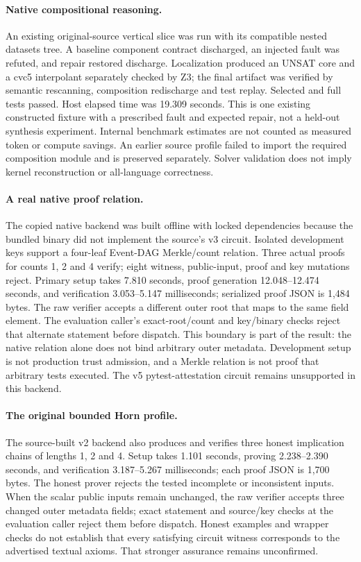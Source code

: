\paragraph{Native compositional reasoning.}
An existing original-source vertical slice was run with its compatible nested
datasets tree. A baseline component contract discharged, an injected fault was
refuted, and repair restored discharge. Localization produced an UNSAT core and
a cvc5 interpolant separately checked by Z3; the final artifact was verified by
semantic rescanning, composition redischarge and test replay. Selected and full
tests passed. Host elapsed time was 19.309 seconds. This is one existing
constructed fixture with a prescribed fault and expected repair, not a held-out
synthesis experiment. Internal benchmark estimates are not counted as measured
token or compute savings. An earlier source profile failed to import the
required composition module and is preserved separately. Solver validation
does not imply kernel reconstruction or all-language correctness.

\paragraph{A real native proof relation.}
The copied native backend was built offline with locked dependencies because
the bundled binary did not implement the source's v3 circuit. Isolated
development keys support a four-leaf Event-DAG Merkle/count relation. Three
actual proofs for counts 1, 2 and 4 verify; eight witness, public-input,
proof and key mutations reject. Primary setup takes 7.810 seconds,
proof generation 12.048--12.474 seconds, and verification
3.053--5.147 milliseconds; serialized proof JSON is 1,484 bytes.
The raw verifier accepts a different outer root that maps to the same field
element. The evaluation caller's exact-root/count and key/binary checks reject
that alternate statement before dispatch. This boundary is part of the result:
the native relation alone does not bind arbitrary outer metadata. Development
setup is not production trust admission, and a Merkle relation is not proof
that arbitrary tests executed. The v5 pytest-attestation circuit remains
unsupported in this backend.

\paragraph{The original bounded Horn profile.}
The source-built v2 backend also produces and verifies three honest implication
chains of lengths 1, 2 and 4. Setup takes 1.101 seconds, proving
2.238--2.390 seconds, and verification
3.187--5.267 milliseconds; each proof JSON is 1,700 bytes.
The honest prover rejects the tested incomplete or inconsistent inputs.
When the scalar public inputs remain unchanged, the raw verifier accepts three
changed outer metadata fields; exact statement and source/key checks at the
evaluation caller reject them before dispatch. Honest examples and wrapper
checks do not establish that every satisfying circuit witness corresponds to
the advertised textual axioms. That stronger assurance remains unconfirmed.

